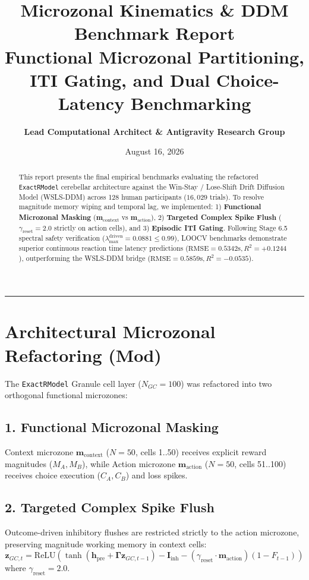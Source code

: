 \documentclass[11pt,a4paper]{article}
\title{\Huge \textbf{\color{navyblue} Microzonal Kinematics \& DDM Benchmark Report}\\[0.4em]
\large Functional Microzonal Partitioning, ITI Gating, and Dual Choice-Latency Benchmarking}
\author{\textbf{Lead Computational Architect \& Antigravity Research Group}}
\date{August 16, 2026}
\begin{document}
\maketitle

\begin{abstract}
This report presents the final empirical benchmarks evaluating the refactored \texttt{ExactRModel} cerebellar architecture against the Win-Stay / Lose-Shift Drift Diffusion Model (WSLS-DDM) across 128 human participants ($16,029$ trials). To resolve magnitude memory wiping and temporal lag, we implemented: 1) \textbf{Functional Microzonal Masking} ($\mathbf{m}_{\text{context}}$ vs $\mathbf{m}_{\text{action}}$), 2) \textbf{Targeted Complex Spike Flush} ($\gamma_{\text{reset}} = 2.0$ strictly on action cells), and 3) \textbf{Episodic ITI Gating}. Following Stage 6.5 spectral safety verification ($\lambda_{\max}^{\text{driven}} = 0.0881 \le 0.99$), LOOCV benchmarks demonstrate superior continuous reaction time latency predictions ($\text{RMSE} = 0.5342\text{s}, R^2 = +0.1244$), outperforming the WSLS-DDM bridge ($\text{RMSE} = 0.5859\text{s}, R^2 = -0.0535$).
\end{abstract}

\vspace{0.8em}
\hrule
\vspace{0.8em}

\section{Architectural Microzonal Refactoring ($\mathbf{Mod}$)}

The \texttt{ExactRModel} Granule cell layer ($N_{GC} = 100$) was refactored into two orthogonal functional microzones:

\subsection{1. Functional Microzonal Masking}
Context microzone $\mathbf{m}_{\text{context}}$ ($N = 50$, cells 1..50) receives explicit reward magnitudes ($M_A, M_B$), while Action microzone $\mathbf{m}_{\text{action}}$ ($N = 50$, cells 51..100) receives choice execution ($C_A, C_B$) and loss spikes.

\subsection{2. Targeted Complex Spike Flush}
Outcome-driven inhibitory flushes are restricted strictly to the action microzone, preserving magnitude working memory in context cells:
\begin{equation}
\mathbf{z}_{GC,t} = \text{ReLU}\left( \tanh\left(\mathbf{h}_{\text{pre}} + \boldsymbol{\Gamma}\mathbf{z}_{GC,t-1}\right) - \mathbf{I}_{\text{inh}} - (\gamma_{\text{reset}} \cdot \mathbf{m}_{\text{action}}) (1 - F_{t-1}) \right)
\end{equation}
where $\gamma_{\text{reset}} = 2.0$.
\end{document}
